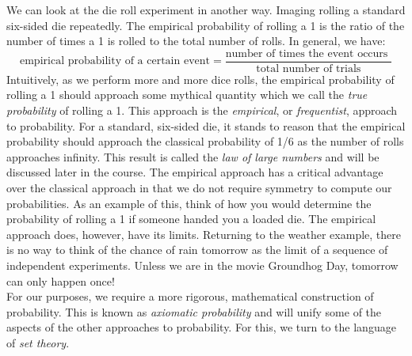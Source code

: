 \documentclass[12pt]{article}
\theoremstyle{definition}
\theoremstyle{remark}
\begin{document}
We can look at the die roll experiment in another way. Imaging rolling a standard six-sided die repeatedly. The empirical probability of rolling a 1 is the ratio of the number of times a 1 is rolled to the total number of rolls. In general, we have:
\[
\text{empirical probability of a certain event} = \frac{ \text{number of times the event occurs }}{\text{total number of trials}}
\]
Intuitively, as we perform more and more dice rolls, the empirical probability of rolling a 1 should approach some mythical quantity which we call the \emph{true probability} of rolling a 1. This approach is the \emph{empirical}, or \emph{frequentist}, approach to probability. For a standard, six-sided die, it stands to reason that the empirical probability should approach the classical probability of 1/6 as the number of rolls approaches infinity. This result is called the \emph{law of large numbers} and will be discussed later in the course. The empirical approach has a critical advantage over the classical approach in that we do not require symmetry to compute our probabilities. As an example of this, think of how you would determine the probability of rolling a 1 if someone handed you a loaded die. The empirical approach does, however, have its limits. Returning to the weather example, there is no way to think of the chance of rain tomorrow as the limit of a sequence of independent experiments. Unless we are in the movie Groundhog Day, tomorrow can only happen once!\\

For our purposes, we require a more rigorous, mathematical construction of probability. This is known as \emph{axiomatic probability} and will unify some of the aspects of the other approaches to probability. For this, we turn to the language of \emph{set theory}.
\end{document}
